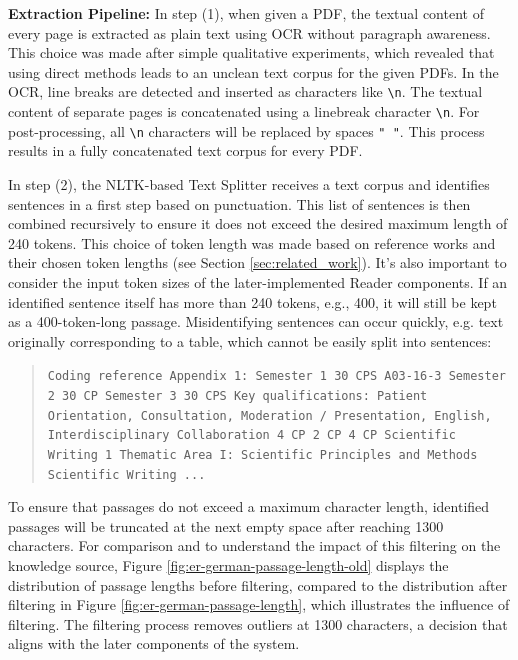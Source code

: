 \textbf{Extraction Pipeline:} In step (1), when given a PDF, the textual content of every page is extracted as plain text using OCR without paragraph awareness. This choice was made after simple qualitative experiments, which revealed that using direct methods leads to an unclean text corpus for the given PDFs. In the OCR, line breaks are detected and inserted as characters like \texttt{\textbackslash n}. The textual content of separate pages is concatenated using a linebreak character \texttt{\textbackslash n}. For post-processing, all \texttt{\textbackslash n} characters will be replaced by spaces \texttt{" "}. This process results in a fully concatenated text corpus for every PDF.

In step (2), the NLTK-based Text Splitter receives a text corpus and identifies sentences in a first step based on punctuation. This list of sentences is then combined recursively to ensure it does not exceed the desired maximum length of 240 tokens. This choice of token length was made based on reference works and their chosen token lengths (see Section \ref{sec:related_work}). It's also important to consider the input token sizes of the later-implemented Reader components. If an identified sentence itself has more than 240 tokens, e.g., 400, it will still be kept as a 400-token-long passage. Misidentifying sentences can occur quickly, e.g. text originally corresponding to a table, which cannot be easily split into sentences:

\begin{quote}
    \texttt{Coding reference Appendix 1: Semester 1 30 CPS A03-16-3 Semester 2 30 CP Semester 3 30 CPS Key qualifications: Patient Orientation, Consultation, Moderation / Presentation, English, Interdisciplinary Collaboration 4 CP 2 CP 4 CP Scientific Writing 1 Thematic Area I: Scientific Principles and Methods Scientific Writing ...}
\end{quote}

To ensure that passages do not exceed a maximum character length, identified passages will be truncated at the next empty space after reaching 1300 characters. For comparison and to understand the impact of this filtering on the knowledge source, Figure \ref{fig:er-german-passage-length-old} displays the distribution of passage lengths before filtering, compared to the distribution after filtering in Figure \ref{fig:er-german-passage-length}, which illustrates the influence of filtering. The filtering process removes outliers at 1300 characters, a decision that aligns with the later components of the system.

